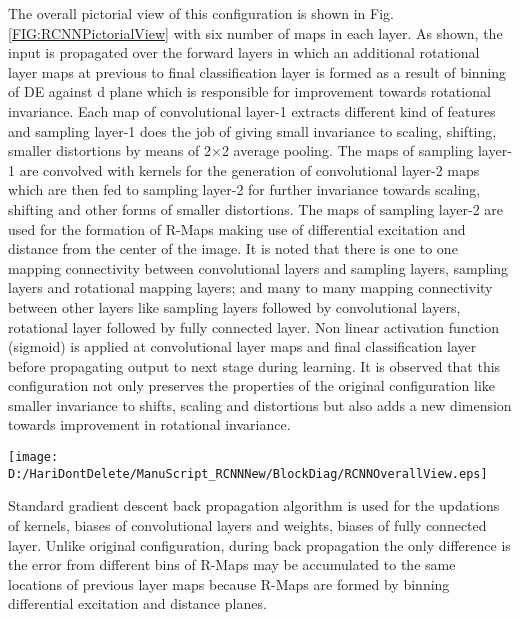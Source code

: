  The overall pictorial view of this configuration is shown in Fig. \ref{FIG:RCNNPictorialView} with six number of maps in each layer. As shown, the input is propagated over the forward layers in which an additional rotational layer maps at previous to final classification layer is formed as a result of binning of DE against d plane which is responsible for improvement towards rotational invariance. Each map of convolutional layer-1 extracts different kind of features and sampling layer-1 does the job of giving small invariance to scaling, shifting, smaller distortions by means of 2$\times$2 average pooling. The maps of sampling layer-1 are convolved with kernels for the generation of convolutional layer-2 maps which are then fed to sampling layer-2 for further invariance towards scaling, shifting and other forms of smaller distortions. The maps of sampling layer-2 are used for the formation of R-Maps making use of differential excitation and distance from the center of the image. It is noted that there is one to one mapping connectivity between convolutional layers and sampling layers, sampling layers and rotational mapping layers; and many to many mapping connectivity between other layers like sampling layers followed by convolutional layers, rotational layer followed by fully connected layer. Non linear activation function (sigmoid) is applied at convolutional layer maps and final classification layer before propagating output to next stage during learning. It is observed that this configuration not only preserves the properties of the original configuration like smaller invariance to shifts, scaling and distortions but also adds a new dimension towards improvement in rotational invariance.\\
 
\begin{figure*}
\centering
\texttt{[image: D:/HariDontDelete/ManuScript\_RCNNNew/BlockDiag/RCNNOverallView.eps]}
\caption{Pictorial view of the rotational maps as previous layer to final classification layer : RCNN Configuration}
\label{FIG:RCNNPictorialView}
\end{figure*}

Standard gradient descent back propagation algorithm \cite{P14}\cite{RCNN15} is used for the updations of kernels, biases of convolutional layers and weights, biases of fully connected layer. Unlike original configuration, during back propagation the only difference is the error from different bins of R-Maps may be accumulated to the same locations of previous layer maps because R-Maps are formed by binning differential excitation and distance planes.\\

